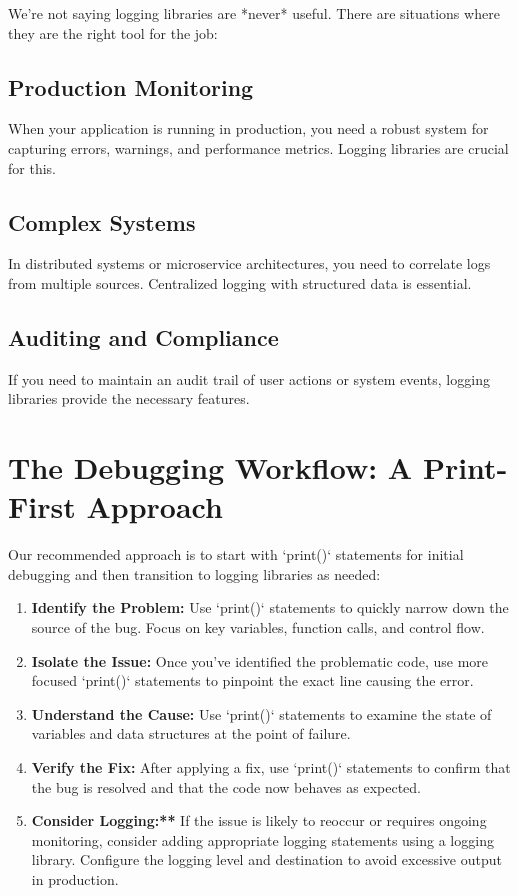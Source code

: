 \documentclass{article}
\begin{document}
We're not saying logging libraries are *never* useful. There are situations where they are the right tool for the job:

\subsection*{Production Monitoring}
When your application is running in production, you need a robust system for capturing errors, warnings, and performance metrics. Logging libraries are crucial for this.

\subsection*{Complex Systems}
In distributed systems or microservice architectures, you need to correlate logs from multiple sources. Centralized logging with structured data is essential.

\subsection*{Auditing and Compliance}
If you need to maintain an audit trail of user actions or system events, logging libraries provide the necessary features.

\section*{The Debugging Workflow: A Print-First Approach}

Our recommended approach is to start with `print()` statements for initial debugging and then transition to logging libraries as needed:

\begin{enumerate}
\item \textbf{Identify the Problem:} Use `print()` statements to quickly narrow down the source of the bug. Focus on key variables, function calls, and control flow.
\item \textbf{Isolate the Issue:} Once you've identified the problematic code, use more focused `print()` statements to pinpoint the exact line causing the error.
\item \textbf{Understand the Cause:} Use `print()` statements to examine the state of variables and data structures at the point of failure.
\item \textbf{Verify the Fix:} After applying a fix, use `print()` statements to confirm that the bug is resolved and that the code now behaves as expected.
\item \textbf{Consider Logging:**} If the issue is likely to reoccur or requires ongoing monitoring, consider adding appropriate logging statements using a logging library. Configure the logging level and destination to avoid excessive output in production.
\end{enumerate}
\end{document}
